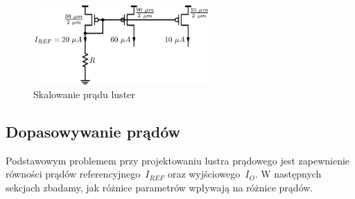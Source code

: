 \documentclass[twoside,pl,final]{labman}
\begin{document}
\begin{figure}[!htbp]
  \centering
  \includegraphics[width=0.6\textwidth]{scale}
  \caption{Skalowanie prądu luster}
  \label{fig:basic:scale}
\end{figure}

\subsection{Dopasowywanie prądów}
\label{matching}
Podstawowym problemem przy projektowaniu lustra prądowego
jest zapewnienie równości prądów referencyjnego~$I_{REF}$
oraz wyjściowego~$I_O$.
W następnych sekcjach zbadamy,
jak różnice parametrów wpływają na różnice prądów.
\end{document}
